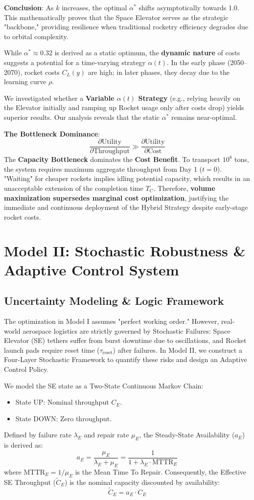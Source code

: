 \documentclass[11pt,letterpaper]{article}
\begin{document}
\noindent \textbf{Conclusion}: As $k$ increases, the optimal $\alpha^*$ shifts asymptotically towards 1.0. This mathematically proves that the Space Elevator serves as the strategic "backbone," providing resilience when traditional rocketry efficiency degrades due to orbital complexity.

While $\alpha^* \approx 0.32$ is derived as a static optimum, the \textbf{dynamic nature} of costs suggests a potential for a time-varying strategy $\alpha(t)$. In the early phase (2050--2070), rocket costs $C_L(y)$ are high; in later phases, they decay due to the learning curve $\rho$.

We investigated whether a \textbf{Variable $\alpha(t)$ Strategy} (e.g., relying heavily on the Elevator initially and ramping up Rocket usage only after costs drop) yields superior results. Our analysis reveals that the static $\alpha^*$ remains near-optimal.

\noindent \textbf{The Bottleneck Dominance}:
\[
\frac{\partial \text{Utility}}{\partial \text{Throughput}} \gg \frac{\partial \text{Utility}}{\partial \text{Cost}}
\]
The \textbf{Capacity Bottleneck} dominates the \textbf{Cost Benefit}. To transport $10^8$ tons, the system requires maximum aggregate throughput from Day 1 ($t=0$). "Waiting" for cheaper rockets implies idling potential capacity, which results in an unacceptable extension of the completion time $T_C$. Therefore, \textbf{volume maximization supersedes marginal cost optimization}, justifying the immediate and continuous deployment of the Hybrid Strategy despite early-stage rocket costs.

\section{Model II: Stochastic Robustness \& Adaptive Control System}
\subsection{Uncertainty Modeling \& Logic Framework}
The optimization in Model I assumes "perfect working order." However, real-world aerospace logistics are strictly governed by Stochastic Failures: Space Elevator (SE) tethers suffer from burst downtime due to oscillations, and Rocket launch pads require reset time ($\tau_{\text{reset}}$) after failures. In Model II, we construct a Four-Layer Stochastic Framework to quantify these risks and design an Adaptive Control Policy.

We model the SE state as a Two-State Continuous Markov Chain:
\begin{itemize}
  \item State UP: Nominal throughput $C_E$.
  \item State DOWN: Zero throughput.
\end{itemize}
Defined by failure rate $\lambda_E$ and repair rate $\mu_E$, the Steady-State Availability ($a_E$) is derived as:
\[
a_E = \frac{\mu_E}{\lambda_E + \mu_E} = \frac{1}{1 + \lambda_E \cdot \text{MTTR}_E}
\]
where $\text{MTTR}_E = 1/\mu_E$ is the Mean Time To Repair. Consequently, the Effective SE Throughput ($\tilde{C}_E$) is the nominal capacity discounted by availability:
\[
\tilde{C}_E = a_E \cdot C_E
\]
\end{document}
